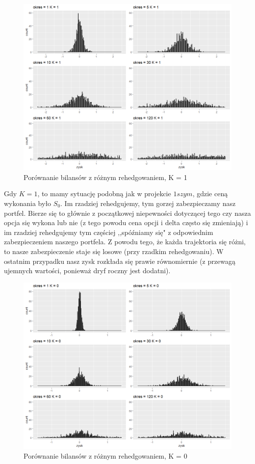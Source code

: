 \documentclass[12pt]{article}
\begin{document}
\begin{figure}[ht!]
\centering
\includegraphics[width=\linewidth]{bilanse_gold_1.png}
\caption{Porównanie bilansów z różnym rehedgowaniem, K = 1}
\end{figure}

Gdy $K = 1$, to mamy sytuację podobną jak w projekcie $1szym$, gdzie ceną wykonania było $S_0$. Im rzadziej rehedgujemy, tym gorzej zabezpieczamy nasz portfel. Bierze się to głównie z początkowej niepewności dotyczącej tego czy nasza opcja się wykona lub nie (z tego powodu cena opcji i delta często się zmieniają) i im rzadziej rehedgujemy tym częściej ,,spóźniamy się" z odpowiednim zabezpieczeniem naszego portfela. Z powodu tego, że każda trajektoria się różni, to nasze zabezpieczenie staje się losowe (przy rzadkim rehedgowaniu). W ostatnim przypadku nasz zysk rozkłada się prawie równomiernie (z przewagą ujemnych wartości, ponieważ dryf roczny jest dodatni).

\newpage


\begin{figure}[ht!]
\centering
\includegraphics[width=\linewidth]{bilanse_gold_0.png}
\caption{Porównanie bilansów z różnym rehedgowaniem, K = 0}
\end{figure}
\end{document}
